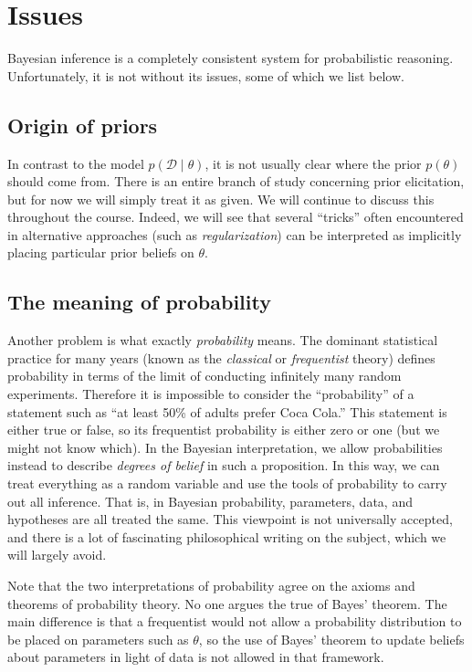 \documentclass{article}
\newcommand{\given}{\mid}
\newcommand{\mc}[1]{\mathcal{#1}}
\newcommand{\data}{\mc{D}}
\begin{document}
\section*{Issues}

Bayesian inference is a completely consistent system for probabilistic
reasoning.  Unfortunately, it is not without its issues, some of which
we list below.

\subsection*{Origin of priors}

In contrast to the model $p(\data \given \theta)$, it is not usually
clear where the prior $p(\theta)$ should come from.  There is an
entire branch of study concerning prior elicitation, but for now we
will simply treat it as given.  We will continue to discuss this
throughout the course.  Indeed, we will see that several ``tricks''
often encountered in alternative approaches (such as
\emph{regularization}) can be interpreted as implicitly placing
particular prior beliefs on $\theta$.

\subsection*{The meaning of probability}

Another problem is what exactly \emph{probability} means.  The
dominant statistical practice for many years (known as the
\emph{classical} or \emph{frequentist} theory) defines probability in
terms of the limit of conducting infinitely many random experiments.
Therefore it is impossible to consider the ``probability'' of a
statement such as ``at least 50\% of adults prefer Coca Cola.''  This
statement is either true or false, so its frequentist probability is
either zero or one (but we might not know which).  In the Bayesian
interpretation, we allow probabilities instead to describe
\emph{degrees of belief} in such a proposition.  In this way, we can
treat everything as a random variable and use the tools of probability
to carry out all inference.  That is, in Bayesian probability,
parameters, data, and hypotheses are all treated the same.  This
viewpoint is not universally accepted, and there is a lot of
fascinating philosophical writing on the subject, which we will
largely avoid.

Note that the two interpretations of probability agree on the axioms
and theorems of probability theory.  No one argues the true of Bayes'
theorem.  The main difference is that a frequentist would not allow a
probability distribution to be placed on parameters such as $\theta$,
so the use of Bayes' theorem to update beliefs about parameters in
light of data is not allowed in that framework.
\end{document}
